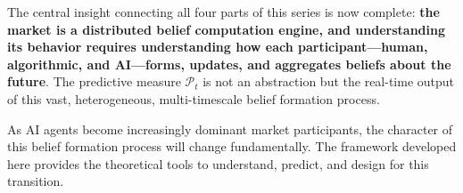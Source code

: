 \documentclass[12pt,a4paper]{article}
\theoremstyle{definition}
\newcommand{\PP}{\mathcal{P}}
\begin{document}
The central insight connecting all four parts of this series is now complete: \textbf{the market is a distributed belief computation engine, and understanding its behavior requires understanding how each participant---human, algorithmic, and AI---forms, updates, and aggregates beliefs about the future}. The predictive measure $\PP_t$ is not an abstraction but the real-time output of this vast, heterogeneous, multi-timescale belief formation process.

As AI agents become increasingly dominant market participants, the character of this belief formation process will change fundamentally. The framework developed here provides the theoretical tools to understand, predict, and design for this transition.

\end{document}
